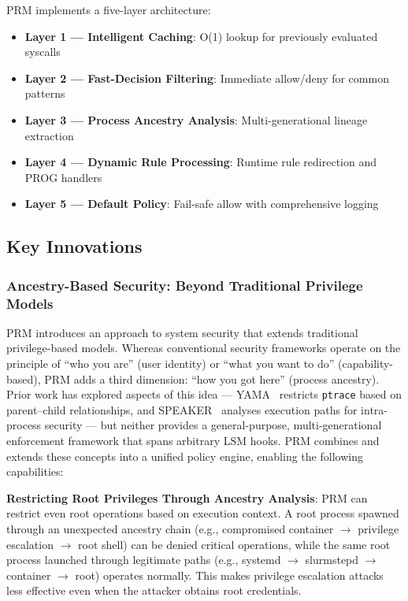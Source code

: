 \documentclass[]{sn-jnl}
\begin{document}
PRM implements a five-layer architecture:

\begin{itemize}
\item \textbf{Layer 1 --- Intelligent Caching}: O(1) lookup for previously
      evaluated syscalls
\item \textbf{Layer 2 --- Fast-Decision Filtering}: Immediate allow/deny for
      common patterns
\item \textbf{Layer 3 --- Process Ancestry Analysis}: Multi-generational lineage
      extraction
\item \textbf{Layer 4 --- Dynamic Rule Processing}: Runtime rule redirection and
      PROG handlers
\item \textbf{Layer 5 --- Default Policy}: Fail-safe allow with comprehensive
      logging
\end{itemize}

\subsection{Key Innovations}

\subsubsection{Ancestry-Based Security: Beyond Traditional Privilege Models}

PRM introduces an approach to system security that extends traditional
privilege-based models. Whereas conventional security frameworks operate on the
principle of ``who you are'' (user identity) or ``what you want to do''
(capability-based), PRM adds a third dimension: ``how you got here'' (process
ancestry). Prior work has explored aspects of this idea --- YAMA~\cite{cook2012yama}
restricts \texttt{ptrace} based on parent--child relationships, and
SPEAKER~\cite{li2018speaker} analyses execution paths for intra-process security
--- but neither provides a general-purpose, multi-generational enforcement
framework that spans arbitrary LSM hooks. PRM combines and extends these concepts
into a unified policy engine, enabling the following capabilities:

\textbf{Restricting Root Privileges Through Ancestry Analysis}: PRM can restrict
even root operations based on execution context. A root process spawned through an
unexpected ancestry chain (e.g., compromised container $\rightarrow$ privilege
escalation $\rightarrow$ root shell) can be denied critical operations, while the
same root process launched through legitimate paths (e.g., systemd $\rightarrow$
slurmstepd $\rightarrow$ container $\rightarrow$ root) operates normally. This
makes privilege escalation attacks less effective even when the attacker obtains
root credentials.
\end{document}
